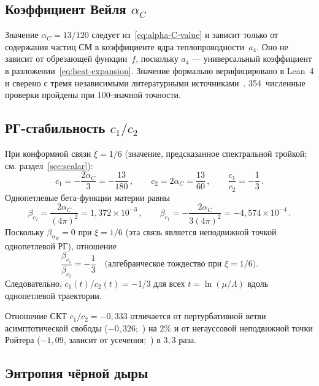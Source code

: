 \documentclass[12pt,a4paper]{article}
\theoremstyle{plain}
\theoremstyle{definition}
\theoremstyle{remark}
\begin{document}
\subsection{Коэффициент Вейля $\alpha_C$}
\label{sec:alphaC}

Значение $\alpha_C = 13/120$ следует из~\eqref{eq:alpha-C-value}
и зависит только от содержания частиц СМ в коэффициенте ядра
теплопроводности~$a_4$. Оно не зависит от обрезающей функции~$f$,
поскольку $a_4$ --- универсальный коэффициент
в разложении~\eqref{eq:heat-expansion}. Значение формально
верифицировано в Lean~4 и сверено с тремя независимыми
литературными источниками~\cite{CZ:2012,CPR:2008,ParkerToms:2009}.
354~численные проверки пройдены при 100-значной точности.

\subsection{РГ-стабильность $c_1/c_2$}
\label{sec:running}

При конформной связи $\xi = 1/6$ (значение, предсказанное
спектральной тройкой; см. раздел~\ref{sec:scalar}):
\begin{equation}\label{eq:c1c2}
  c_1 = -\frac{2\alpha_C}{3} = -\frac{13}{180}\,,\qquad
  c_2 = 2\alpha_C = \frac{13}{60}\,,\qquad
  \frac{c_1}{c_2} = -\frac{1}{3}\,.
\end{equation}
Однопетлевые бета-функции материи равны
\begin{equation}\label{eq:betas}
  \beta_{c_2} = \frac{2\alpha_C}{(4\pi)^2}
  = 1{,}372 \times 10^{-3}\,,\qquad
  \beta_{c_1} = -\frac{2\alpha_C}{3(4\pi)^2}
  = -4{,}574 \times 10^{-4}\,.
\end{equation}
Поскольку $\beta_{\alpha_R} = 0$ при $\xi = 1/6$ (эта связь
является неподвижной точкой однопетлевой РГ), отношение
\begin{equation}\label{eq:ratio-frozen}
  \frac{\beta_{c_1}}{\beta_{c_2}} = -\frac{1}{3}
  \quad\text{(алгебраическое тождество при $\xi = 1/6$)}.
\end{equation}
Следовательно, $c_1(t)/c_2(t) = -1/3$ для всех
$t = \ln(\mu/\Lambda)$ вдоль однопетлевой траектории.

Отношение СКТ $c_1/c_2 = -0{,}333$ отличается от пертурбативной
ветви асимптотической свободы ($-0{,}326$;~\cite{Shapiro:2004})
на $2\%$ и от негауссовой неподвижной точки Ройтера
($-1{,}09$, зависит от усечения;~\cite{BMS:2009}) в $3{,}3$ раза.

\subsection{Энтропия чёрной дыры}
\label{sec:clog}
\end{document}

